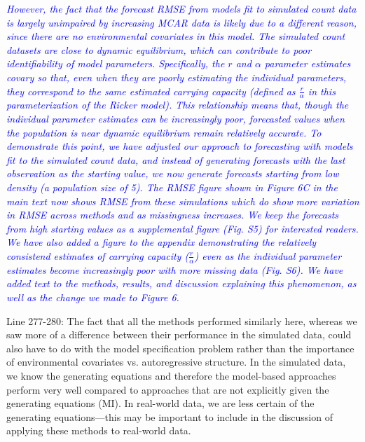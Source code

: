 \documentclass{article}
\begin{document}
\begin{linenumbers}
\noindent \textcolor{blue}{\textit{However, the fact that the forecast RMSE from models fit to simulated count data is largely unimpaired by increasing MCAR data is likely due to a different reason, since there are no environmental covariates in this model. The simulated count datasets are close to dynamic equilibrium, which can contribute to poor identifiability of model parameters. Specifically, the $r$ and $\alpha$ parameter estimates covary so that, even when they are poorly estimating the individual parameters, they correspond to the same estimated carrying capacity (defined as $\frac{r}{\alpha}$ in this parameterization of the Ricker model). This relationship means that, though the individual parameter estimates can be increasingly poor, forecasted values when the population is near dynamic equilibrium remain relatively accurate. To demonstrate this point, we have adjusted our approach to forecasting with models fit to the simulated count data, and instead of generating forecasts with the last observation as the starting value, we now generate forecasts starting from low density (a population size of 5). The RMSE figure shown in Figure 6C in the main text now shows RMSE from these simulations which do show more variation in RMSE across methods and as missingness increases. We keep the forecasts from high starting values as a supplemental figure (Fig. S5) for interested readers. We have also added a figure to the appendix demonstrating the relatively consistend estimates of carrying capacity ($\frac{r}{\alpha}$) even as the individual parameter estimates become increasingly poor with more missing data (Fig. S6). We have added text to the methods, results, and discussion explaining this phenomenon, as well as the change we made to Figure 6.}}


Line 277-280: The fact that all the methods performed similarly here, whereas we saw more of a difference between their performance in the simulated data, could also have to do with the model specification problem rather than the importance of environmental covariates vs. autoregressive structure. In the simulated data, we know the generating equations and therefore the model-based approaches perform very well compared to approaches that are not explicitly given the generating equations (MI). In real-world data, we are less certain of the generating equations—this may be important to include in the discussion of applying these methods to real-world data. 



\end{linenumbers}
\end{document}
